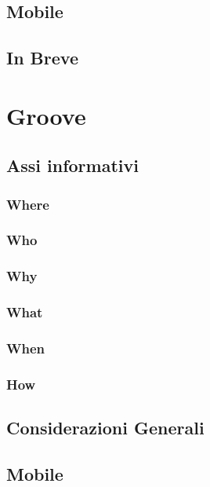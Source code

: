 \documentclass[a4paper, oneside, openany, dvipsnames, table]{article}
\begin{document}
	\subsection{Mobile}
			
	\subsection{In Breve}
			
			
\newpage
\section{Groove}
\label{sez:Groove}

	\subsection{Assi informativi}
		\subsubsection{Where}
			
		\subsubsection{Who}
			
		\subsubsection{Why}
			
		\subsubsection{What}
			
		\subsubsection{When}
			
		\subsubsection{How}
			
	\subsection{Considerazioni Generali}
	\label{sec:HomeDesc}
				
	\subsection{Mobile}
			
\end{document}
